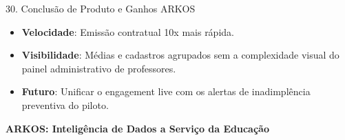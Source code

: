 \documentclass[10pt, aspectratio=169]{beamer}
\begin{document}
\begin{frame}{30. Conclusão de Produto e Ganhos ARKOS}
    \begin{center}
    \begin{tcolorbox}[enhanced,title=Vantagem ARKOS consolidada,colback=black!30,colframe=ArkosGreen,width=0.85\textwidth,fonttitle=\bfseries]
        \begin{itemize}
            \item \textbf{Velocidade}: Emissão contratual 10x mais rápida.
            \item \textbf{Visibilidade}: Médias e cadastros agrupados sem a complexidade visual do painel administrativo de professores.
            \item \textbf{Futuro}: Unificar o engagement live com os alertas de inadimplência preventiva do piloto.
        \end{itemize}
    \end{tcolorbox}
    \vspace{0.2cm}
    \textcolor{ArkosGreen}{\large \textbf{ARKOS: Inteligência de Dados a Serviço da Educação}}
    \end{center}
\end{frame}
\end{document}
